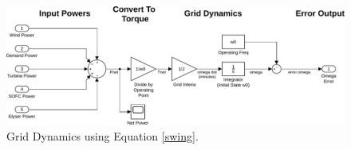 \begin{figure}[p]
\centering
        \includegraphics[scale=0.65]{images/plant2/grid.pdf}
    \caption{Grid Dynamics using Equation \ref{swing}.}
        \label{fig:grid}
\end{figure}
